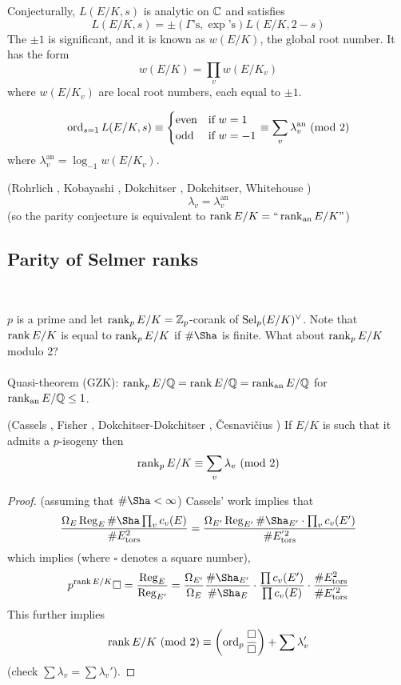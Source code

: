 \documentclass[12pt,amsfont]{amsart}
\begin{document}
Conjecturally, $L(E/K,s)$ is analytic on ${\mathbb C}$ and satisfies 
\[L(E/K, s) = \pm(\Gamma\text{'s}, \exp\text{'s}) L(E/K, 2-s)\]
The $\pm 1$ is significant, and it is known as $w(E/K)$, the global root number. It has the form
\[w(E/K) = \prod_v w(E/K_v)\]
where $w(E/K_v)$ are local root numbers, each equal to $\pm 1$. 

\[\ord_{s=1} L(E/K,s) \equiv \begin{cases} \text{even} & \text{if } w = 1 \\ \text{odd} & \text{if } w = -1 \end{cases} \equiv \sum_v \lambda_v^{\text{an}} \pmod{2} \]
where $\lambda_v^{\text{an}} = \log_{-1} w(E/K_v).$

\begin{thm} (Rohrlich , Kobayashi , Dokchitser , Dokchitser, Whitehouse ) 
\[\lambda_v = \lambda_v^{\text{an}}\]
(so the parity conjecture is equivalent to $\operatorname{rank} E/K = \text{``} \operatorname{rank}_{\text{an}} E/K \text{''}$)
\end{thm}

\subsection{Parity of Selmer ranks}
{\ }

$p$ is a prime and let $\operatorname{rank}_p E/K = {\mathbb Z}_p$-corank of $\operatorname{Sel}_p(E/K)^{\vee}$. Note that $\operatorname{rank} E/K$ is equal to $\operatorname{rank}_p E/K$ if $\# \Sha$ is finite. What about $\operatorname{rank}_p E/K$ modulo 2? \\ \\
Quasi-theorem (GZK): $\operatorname{rank}_p E/{\mathbb Q} = \operatorname{rank} E/{\mathbb Q} = \operatorname{rank}_{\text{an}} E/{\mathbb Q}$ for $\operatorname{rank}_{\text{an}} E/{\mathbb Q} \leq 1$. 

\begin{thm} (Cassels , Fisher , Dokchitser-Dokchitser , \v{C}esnavi\v{c}ius ) If $E/K$ is such that it admits a $p$-isogeny then 
\[\rank_p E/K \equiv \sum_{v} \lambda_v \pmod{2} \]
\end{thm}

\begin{proof} (assuming that $\# \Sha < \infty$) Cassels' work implies that
\[\frac{\Omega_E \operatorname{Reg}_E \# \Sha \prod_v c_v(E)}{\# E_{\text{tors}}^2} = \frac{\Omega_{E'} \operatorname{Reg}_{E'} \# \Sha_{E'} \cdot \prod_v c_v(E')}{\# E_{\text{tors}}^{'2}} \]
which implies (where $\square$ denotes a square number),
\[ p^{\rank E/K} \square = \frac{\operatorname{Reg}_E}{\Reg_{E'}} = \frac{\Omega_{E'}}{\Omega_E} \frac{\# \Sha_{E'}}{\# \Sha_E} \cdot \frac{\prod c_v(E')}{\prod c_v(E)} \cdot \frac{\#E_{\text{tors}}^2}{\# E_{\text{tors}}^{'2}}\]
This further implies 
\[\rank E/K \pmod{2} \equiv \left(\ord_p \frac{\square}{\square}\right) + \sum \lambda_v' \]
(check $\sum \lambda_v = \sum \lambda_v'$). 
\end{proof}
\end{document}
